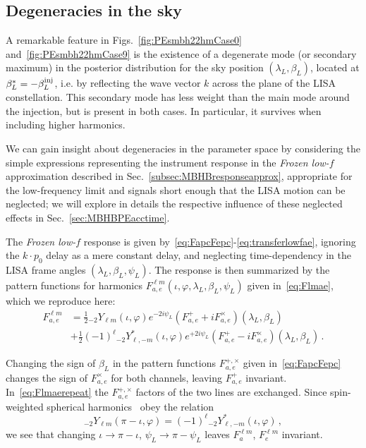 \documentclass[aps,showpacs,twocolumn,prd,superscriptaddress,nofootinbib]{revtex4-1}
\newcommand{\be}{\begin{equation}}
\newcommand{\ee}{\end{equation}}
\newcommand{\nn}{\nonumber}
\newcommand{\sYlm}{{}_{-2}Y_{\ell m}}
\newcommand{\sYlminusmstar}{{}_{-2}Y_{\ell, -m}^{*}}
\begin{document}

\subsection{Degeneracies in the sky}
\label{subsec:MBHBPEdegen}

A remarkable feature in Figs.~\ref{fig:PEsmbh22hmCase0} and~\ref{fig:PEsmbh22hmCase9} is the existence of a degenerate mode (or secondary maximum) in the posterior distribution for the sky position $(\lambda_{L}, \beta_{L})$, located at $\beta_{L}^{*} = -\beta_{L}^{\rm inj}$, i.e. by reflecting the wave vector $k$ across the plane of the LISA constellation. This secondary mode has less weight than the main mode around the injection, but is present in both cases. In particular, it survives when including higher harmonics.

We can gain insight about degeneracies in the parameter space by considering the simple expressions representing the instrument response in the \textit{Frozen low-$f$} approximation described in Sec.~\ref{subsec:MBHBresponseapprox}, appropriate for the low-frequency limit and signals short enough that the LISA motion can be neglected; we will explore in details the respective influence of these neglected effects in Sec.~\ref{sec:MBHBPEacctime}.

The \textit{Frozen low-$f$} response is given by~\eqref{eq:FapcFepc}-\eqref{eq:transferlowfae}, ignoring the $k\cdot p_{0}$ delay as a mere constant delay, and neglecting time-dependency in the LISA frame angles $(\lambda_{L}, \beta_{L}, \psi_{L})$. The response is then summarized by the pattern functions for harmonics $F^{\ell m}_{a,e} (\iota, \varphi, \lambda_{L}, \beta_{L}, \psi_{L})$ given in~\eqref{eq:Flmae}, which we reproduce here:
\begin{align}\label{eq:Flmaerepeat}
	F_{a,e}^{\ell m} &= \frac{1}{2} \sYlm (\iota, \varphi) e^{-2 i \psi_{L}} \left( F_{a,e}^{+} + i F_{a,e}^{\times}\right) (\lambda_{L}, \beta_{L}) \nn\\
	& + \frac{1}{2} (-1)^{\ell} \sYlminusmstar (\iota, \varphi) e^{+2 i \psi_{L}} \left( F_{a,e}^{+} - i F_{a,e}^{\times} \right) (\lambda_{L}, \beta_{L}) \,.
\end{align}

Changing the sign of $\beta_{L}$ in the pattern functions $F_{a,e}^{+,\times}$ given in~\eqref{eq:FapcFepc} changes the sign of $F_{a,e}^{\times}$ for both channels, leaving $F_{a,e}^{+}$ invariant. In~\eqref{eq:Flmaerepeat} the $F_{a,e}^{+,\times}$ factors of the two lines are exchanged. Since spin-weighted spherical harmonics~\cite{Goldberg+67} obey the relation
\be
	\sYlm (\pi - \iota, \varphi) = (-1)^{\ell} \sYlminusmstar (\iota, \varphi) \,,
\ee
we see that changing $\iota \rightarrow \pi-\iota$, $\psi_{L} \rightarrow \pi - \psi_{L}$ leaves $F_{a}^{\ell m}$, $F_{e}^{\ell m}$ invariant.
\end{document}
